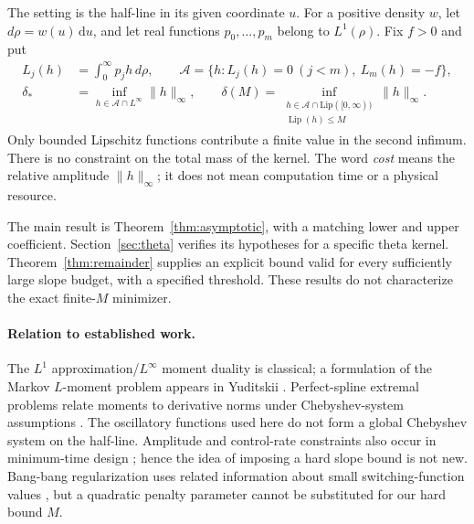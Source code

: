 \documentclass[11pt,a4paper]{article}
\numberwithin{equation}{section}
\theoremstyle{remark}\newtheorem{remark}[theorem]{Remark}
\DeclareMathOperator{\Lip}{Lip}
\newcommand{\dd}{\,\mathrm du}
\newcommand{\ds}{\delta_*}
\newcommand{\norm}[1]{\lVert#1\rVert}
\begin{document}
The setting is the half-line in its given coordinate $u$. For a positive
density $w$, let $d\rho=w(u)\dd$, and let real functions $p_0,\ldots,p_m$
belong to $L^1(\rho)$. Fix $f>0$ and put
\begin{align}
 L_j(h)&=\int_0^\infty p_jh\,d\rho,\qquad
 \mathcal A=\{h:L_j(h)=0\ (j<m),\ L_m(h)=-f\},\label{eq:target}\\
 \ds&=\inf_{h\in\mathcal A\cap L^\infty}\norm h_\infty,\qquad
 \delta(M)=\inf_{\substack{h\in\mathcal A\cap\mathrm{Lip}([0,\infty))\\
                         \Lip(h)\le M}}\norm h_\infty.\label{eq:cost}
\end{align}
Only bounded Lipschitz functions contribute a finite value in the second
infimum. There is no constraint on the total mass of the kernel.
The word \emph{cost} means the relative amplitude $\norm h_\infty$;
it does not mean computation time or a physical resource.

The main result is Theorem~\ref{thm:asymptotic}, with a matching lower and
upper coefficient. Section~\ref{sec:theta} verifies its hypotheses for a
specific theta kernel. Theorem~\ref{thm:remainder} supplies an explicit
bound valid for every sufficiently large slope budget, with a specified
threshold. These results do not characterize the exact finite-$M$
minimizer.

\paragraph{Relation to established work.}
The $L^1$ approximation/$L^\infty$ moment duality is classical; a formulation
of the Markov $L$-moment problem appears in Yuditskii
\cite[Problems 1.2--1.3]{yuditskii}. Perfect-spline extremal problems relate
moments to derivative norms under Chebyshev-system assumptions
\cite[Sections 7--8]{karlin}. The oscillatory functions used here do not
form a global Chebyshev system on the half-line. Amplitude and control-rate
constraints also occur in minimum-time design \cite{albassam}; hence the
idea of imposing a hard slope bound is not new. Bang-bang regularization
uses related information about small switching-function values
\cite{wachsmuth}, but a quadratic penalty parameter cannot be substituted
for our hard bound $M$.
\end{document}
